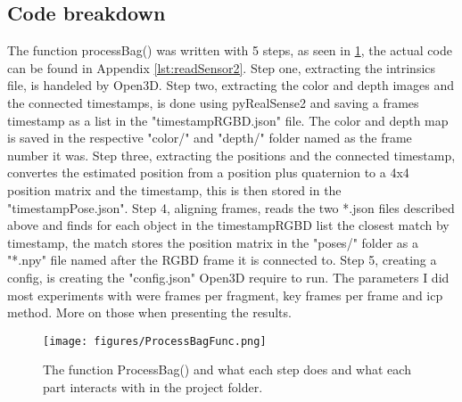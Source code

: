 \subsection{Code breakdown}

The function processBag() was written with 5 steps, as seen in \ref{fig:procBag}, the actual code can be found in Appendix \ref{lst:readSensor2}. Step one, extracting the intrinsics file, is handeled by Open3D. Step two, extracting the color and depth images and the connected timestamps, is done using pyRealSense2 and saving a frames timestamp as a list in the "timestampRGBD.json" file. The color and depth map is saved in the respective "color/" and "depth/" folder named as the frame number it was. Step three, extracting the positions and the connected timestamp, convertes the estimated position from a position plus quaternion to a 4x4 position matrix and the timestamp, this is then stored in the "timestampPose.json". Step 4, aligning frames, reads the two *.json files described above and finds for each object in the timestampRGBD list the closest match by timestamp, the match stores the position matrix in the "poses/" folder as a "*.npy" file named after the RGBD frame it is connected to. Step 5, creating a config, is creating the "config.json" Open3D require to run. The parameters I did most experiments with were frames per fragment, key frames per frame and icp method. More on those when presenting the results. 
\begin{figure}
    \centering
    \texttt{[image: figures/ProcessBagFunc.png]}
    \caption{The function ProcessBag() and what each step does and what each part interacts with in the project folder. }
    \label{fig:procBag}
\end{figure}

